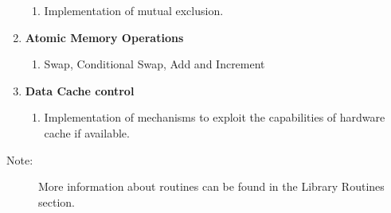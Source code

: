 \begin{enumerate}
\begin{enumerate}
\item Implementation of mutual exclusion.
\end{enumerate}
\item \textbf{Atomic Memory Operations}

\begin{enumerate}
\item Swap, Conditional Swap, Add and Increment 
\end{enumerate}
\item \textbf{Data Cache control}

\begin{enumerate}
\item Implementation of mechanisms to exploit the capabilities of hardware
cache if available.
\end{enumerate}
\end{enumerate}
\begin{description}
\item [{{Note:}}] More information about \openshmem routines can be found
in the Library Routines section.
\end{description}
